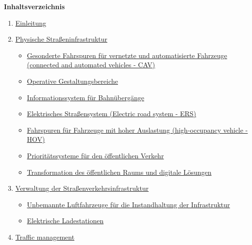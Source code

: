 \documentclass[
]{book}
\providecommand{\tightlist}{%
  \setlength{\itemsep}{0pt}\setlength{\parskip}{0pt}}
\begin{document}
\textbf{Inhaltsverzeichnis}

\begin{enumerate}
\def\labelenumi{\arabic{enumi}.}
\tightlist
\item
  \protect\hyperlink{intro}{Einleitung}
\item
  \protect\hyperlink{infrastructure}{Physische Straßeninfrastruktur}

  \begin{itemize}
  \tightlist
  \item
    \protect\hyperlink{dedicated_lanes}{Gesonderte Fahrspuren für vernetzte und automatisierte Fahrzeuge (connected and automated vehicles - CAV)}\\
  \item
    \protect\hyperlink{ODD}{Operative Gestaltungsbereiche}\\
  \item
    \protect\hyperlink{rail_crossing_info_system}{Informationssystem für Bahnübergänge}\\
  \item
    \protect\hyperlink{ers}{Elektrisches Straßensystem (Electric road system - ERS)}\\
  \item
    \protect\hyperlink{high_occupancy}{Fahrspuren für Fahrzeuge mit hoher Auslastung (high-occupancy vehicle - HOV)}\\
  \item
    \protect\hyperlink{public_trans_priority}{Prioritätssysteme für den öffentlichen Verkehr}\\
  \item
    \protect\hyperlink{transformation_public_space}{Transformation des öffentlichen Raums und digitale Lösungen}\\
  \end{itemize}
\item
  \protect\hyperlink{highway}{Verwaltung der Straßenverkehrsinfrastruktur}

  \begin{itemize}
  \tightlist
  \item
    \protect\hyperlink{uav}{Unbemannte Luftfahrzeuge für die Instandhaltung der Infrastruktur}\\
  \item
    \protect\hyperlink{charging_station}{Elektrische Ladestationen}\\
  \end{itemize}
\item
  \protect\hyperlink{traffic}{Traffic management}


\end{enumerate}
\end{document}
